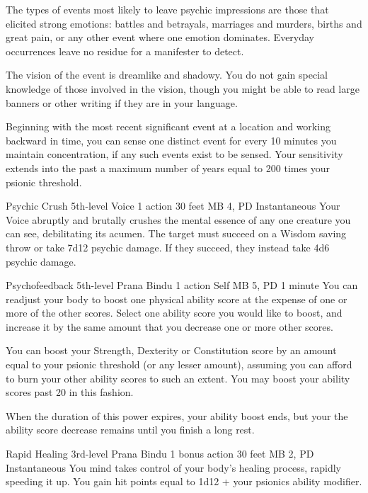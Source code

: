 The types of events most likely to leave
psychic impressions are those that elicited strong emotions:
battles and betrayals,
marriages and murders,
births and great pain,
or any other event where one emotion dominates.
Everyday occurrences leave no residue for a manifester to detect.

The vision of the event is dreamlike and shadowy.
You do not gain special knowledge of those involved in the vision,
though you might be able to read large banners
or other writing if they are in your language.

Beginning with the most recent significant event
at a location and working backward in time,
you can sense one distinct event for every 10 minutes
you maintain concentration,
if any such events exist to be sensed.
Your sensitivity extends into the past
a maximum number of years equal to
200 times your psionic threshold.

\DndPowerHeader%
  {Psychic Crush}
  {5th-level Voice}
  {1 action}
  {30 feet}
  {MB 4, PD \lvlfive}
  {Instantaneous}
Your Voice abruptly and brutally crushes the mental essence
of any one creature you can see, debilitating its acumen.
The target must succeed on a Wisdom saving throw
or take 7d12 psychic damage.
If they succeed, they instead take 4d6 psychic damage.

\DndPowerHeader%
  {Psychofeedback}
  {5th-level Prana Bindu}
  {1 action}
  {Self}
  {MB 5, PD \lvlfive}
  {1 minute}
You can readjust your body to boost one
physical ability score at the expense of one
or more of the other scores.
Select one ability score you would like to boost,
and increase it by the same amount that you decrease
one or more other scores.

You can boost your
Strength, Dexterity or Constitution score by an
amount equal to your psionic threshold
(or any lesser amount),
assuming you can afford to burn your other ability
scores to such an extent.
You may boost your ability scores past 20 in this fashion.

When the duration of this power expires,
your ability boost ends,
but your the ability score decrease
remains until you finish a long rest.

\DndPowerHeader%
  {Rapid Healing}
  {3rd-level Prana Bindu}
  {1 bonus action}
  {30 feet}
  {MB 2, PD \lvlthree}
  {Instantaneous}
You mind takes control of your body's healing process,
rapidly speeding it up.
You gain hit points equal to 1d12 + your psionics ability modifier.

